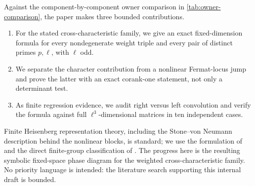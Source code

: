 Against the component-by-component owner comparison in
\cref{tab:owner-comparison}, the paper makes three bounded contributions.
\begin{enumerate}
\item For the stated cross-characteristic family, we give an exact
      fixed-dimension formula for every nondegenerate weight
      triple and every pair of distinct primes $p,\ell$, with $\ell$ odd.
\item We separate the character contribution from a nonlinear Fermat-locus
      jump and prove the latter with an exact corank-one statement, not only a
      determinant test.
\item As finite regression evidence, we audit right versus left convolution
      and verify the formula against full $\ell^3$-dimensional matrices in ten
      independent cases.
\end{enumerate}

Finite Heisenberg representation theory, including the Stone--von Neumann
description behind the nonlinear blocks, is standard; we use the formulation
of \citet{GurevichHadani2010} and the direct finite-group classification of
\citet{GrassbergerHormann2001}.  The progress here is the resulting symbolic
fixed-space phase diagram for the weighted cross-characteristic family.  No
priority language is intended: the literature search supporting this internal
draft is bounded.
